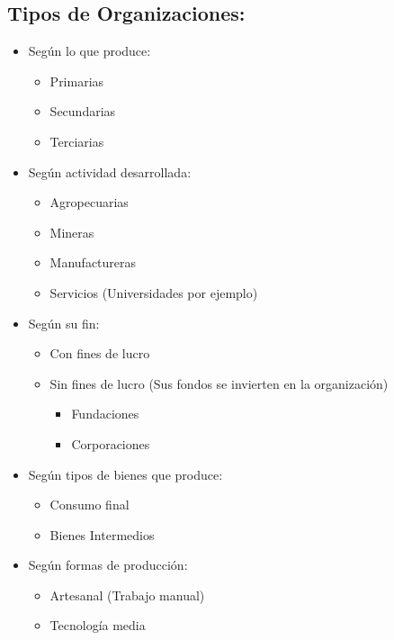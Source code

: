 \documentclass{templateNote}
\begin{document}
\begin{itemize}
    \subsection{Tipos de Organizaciones:}
    \begin{itemize}
        \item Según lo que produce:
            \begin{itemize}
                \item Primarias
                \item Secundarias
                \item Terciarias
            \end{itemize}
        \item Según actividad desarrollada:
            \begin{itemize}
                \item Agropecuarias
                \item Mineras
                \item Manufactureras
                \item Servicios (Universidades por ejemplo)
            \end{itemize}
        \item Según su fin:
            \begin{itemize}
                \item Con fines de lucro
                \item Sin fines de lucro (Sus fondos se invierten en la organización)
                \begin{itemize}
                    \item Fundaciones
                    \item Corporaciones
                \end{itemize}
            \end{itemize}
        \item Según tipos de bienes que produce:
            \begin{itemize}
                \item Consumo final
                \item Bienes Intermedios
            \end{itemize}
        \item Según formas de producción:
            \begin{itemize}
                \item Artesanal (Trabajo manual)
                \item Tecnología media

\end{itemize}
\end{itemize}
\end{itemize}
\end{document}
